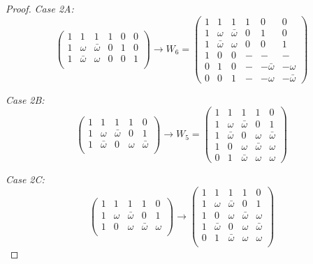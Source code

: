 \begin{lemma}
\begin{proof}
 \emph{Case 2A:}
 $$\left(\begin{array}{cccccc}
     1 & 1 & 1 & 1 & 0 & 0 \\
     1 & \omega & \bar\omega & 0 & 1 & 0\\
     1 & \bar\omega & \omega & 0 & 0 & 1 \\
    \end{array}\right)
 \longrightarrow
 W_6 = \left(\begin{array}{cccccc}
     1 & 1 & 1 & 1 & 0 & 0\\
     1 & \omega & \bar\omega & 0 & 1 & 0\\
     1 & \bar\omega & \omega & 0 & 0 & 1 \\
     1 & 0 & 0 & - & - & -\\
     0 & 1 & 0 & - & -\bar\omega & -\omega\\
     0 & 0 & 1 & - & -\omega & -\bar\omega
    \end{array}\right)$$

\emph{Case 2B:}
 $$\left(\begin{array}{cccccc}
     1 & 1 & 1 & 1 & 0 \\
     1 & \omega & \bar\omega & 0 & 1 \\
     1 & \bar\omega & 0 & \omega & \bar\omega \\
    \end{array}\right)
 \longrightarrow
 W_5=\left(\begin{array}{cccccc}
     1 & 1 & 1 & 1 & 0 \\
     1 & \omega & \bar\omega & 0 & 1 \\
     1 & \bar\omega & 0 & \omega & \bar\omega \\
     1 & 0 & \omega & \bar\omega & \omega \\
     0 & 1 & \bar\omega & \omega & \omega
    \end{array}\right)$$

\emph{Case 2C:}
 $$\left(\begin{array}{cccccc}
     1 & 1 & 1 & 1 & 0 \\
     1 & \omega & \bar\omega & 0 & 1 \\
     1 & 0 & \omega & \bar\omega & \omega \\
  \end{array}\right)
  \longrightarrow
  \left(\begin{array}{cccccc}
     1 & 1 & 1 & 1 & 0 \\
     1 & \omega & \bar\omega & 0 & 1 \\
     1 & 0 & \omega & \bar\omega & \omega \\
     1 & \bar\omega & 0 & \omega & \bar\omega \\
     0 & 1 & \bar\omega & \omega & \omega \\
  \end{array}\right)$$


\end{proof}
\end{lemma}
